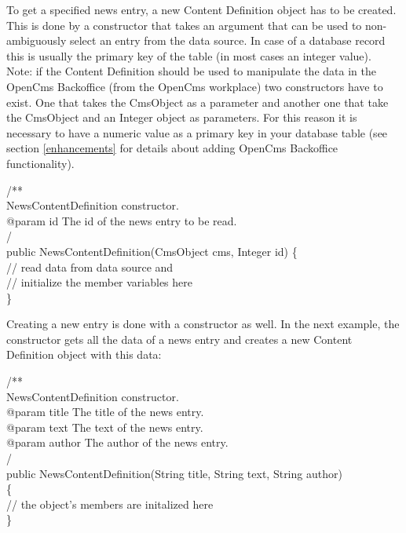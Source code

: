 To get a specified news entry, a new Content Definition object has to be
created. This is done by a constructor that takes an argument that can
be used to non-ambiguously select an entry from the data source. In case 
of a database record this is usually the primary key of the table (in 
most cases an integer value). \\
Note: if the Content Definition should be used to manipulate the data in 
the OpenCms Backoffice (from the OpenCms workplace) two constructors have to 
exist.
One that takes the {\class CmsObject} as a parameter and another one
that take the {\class CmsObject} and an Integer object as parameters.
For this reason it is necessary to have a numeric value as a primary key 
in your database table (see section \ref{enhancements} 
for details about adding OpenCms Backoffice functionality).

\begin{java}
\jtaba         /**\\
\jtaba  \xspace * NewsContentDefinition constructor.\\
\jtaba  \xspace * @param id The id of the news entry to be read.\\
\jtaba  \xspace */\\
\jtaba public NewsContentDefinition(CmsObject cms, Integer id) \{\\
\jtabb  // read data from data source and\\
\jtabb  // initialize the member variables here\\
\jtaba \}\\
\end{java}

Creating a new entry is done with a constructor as well. In the next
example, the constructor gets all the data of a news entry and creates 
a new Content Definition object with this data:

\begin{java}
\jtaba         /**\\
\jtaba  \xspace * NewsContentDefinition constructor.\\
\jtaba  \xspace * @param title The title of the news entry.\\
\jtaba  \xspace * @param text The text of the news entry.\\
\jtaba  \xspace * @param author The author of the news entry.\\
\jtaba  \xspace */\\
\jtaba public NewsContentDefinition(String title, String text, String author)\\
\jtaba \{\\
\jtabb        // the object's members are initalized here\\
\jtaba \}\\
\end{java}

